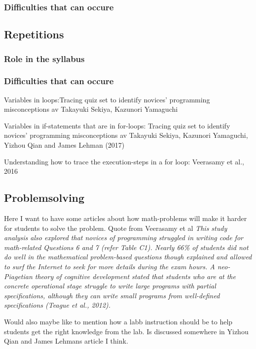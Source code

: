 \documentclass[twocolumn]{article}
\begin{document}
\subsubsection{Difficulties that can occure}

\subsection{Repetitions}

\subsubsection{Role in the syllabus}

\subsubsection{Difficulties that can occure}

Variables in loops:Tracing quiz set to identify novices' programming misconceptions av Takayuki Sekiya, Kazunori Yamaguchi

Variables in if-statements that are in for-loops: Tracing quiz set to identify novices' programming misconceptions av Takayuki Sekiya, Kazunori Yamaguchi, Yizhou Qian and James Lehman (2017)

Understanding how to trace the execution-steps in a for loop: Veerasamy et al., 2016

\subsection{Problemsolving}

Here I want to have some articles about how math-problems will make it harder for students to solve the problem. Quote from Veerasamy et al \emph{This study analysis also explored that novices of programming struggled in writing code for math-related Questions 6 and 7 (refer Table C1). Nearly 66\% of students did not do well in the mathematical problem-based questions though explained and allowed to surf the Internet to seek for more details during the exam hours. A neo-Piagetian theory of cognitive development stated that students who are at the concrete operational stage struggle to write large programs with partial specifications, although they can write small programs from well-defined specifications (Teague et al., 2012).}

Would also maybe like to mention how a labb instruction should be to help students get the right knowledge from the lab. Is discussed somewhere in Yizhou Qian and James Lehmans article I think.
\end{document}
